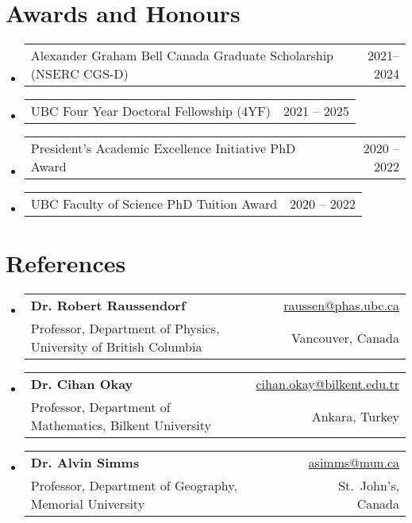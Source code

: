 \documentclass[letterpaper,11pt]{article}
\makeatletter
\newcommand{\AwardsItem}[2]{
	\item{\vspace{-1pt}
		\begin{tabular*}{0.97\textwidth}{l@{\extracolsep{\fill}}r}
			{#1} & {#2}
		\end{tabular*}
		\vspace{-5pt}
	}
}
\newcommand{\ReferencesItem}[4]{
	\item{\vspace{-1pt}
		\begin{tabular*}{0.97\textwidth}{l@{\extracolsep{\fill}}r}
			\textbf{#1} & {#2}\\
			{#3} & {#4}
		\end{tabular*}
		\vspace{-5pt}
	}
}
\makeatother
\begin{document}
\section*{Awards and Honours}
\begin{itemize}[leftmargin=*]
	\AwardsItem{Alexander Graham Bell Canada Graduate Scholarship (NSERC CGS-D)}{2021--2024}
	\AwardsItem{UBC Four Year Doctoral Fellowship (4YF)}{2021 -- 2025}
	\AwardsItem{President's Academic Excellence Initiative PhD Award}{2020 -- 2022}
	\AwardsItem{UBC Faculty of Science PhD Tuition Award }{2020 -- 2022}
\end{itemize}


\section*{References}
\begin{itemize}[leftmargin=*]
	\ReferencesItem{Dr. Robert Raussendorf}{\href{mailto:raussen@phas.ubc.ca}{raussen@phas.ubc.ca}}{Professor, Department of Physics, University of British Columbia}{Vancouver, Canada}
	
	\ReferencesItem{Dr. Cihan Okay}{\href{mailto:cihan.okay@bilkent.edu.tr}{cihan.okay@bilkent.edu.tr}}{Professor, Department of Mathematics, Bilkent University}{Ankara, Turkey}
	
	\ReferencesItem{Dr. Alvin Simms}{\href{mailto:asimms@mun.ca}{asimms@mun.ca}}{Professor, Department of Geography, Memorial University}{St.~John's, Canada}
\end{itemize}
\end{document}
